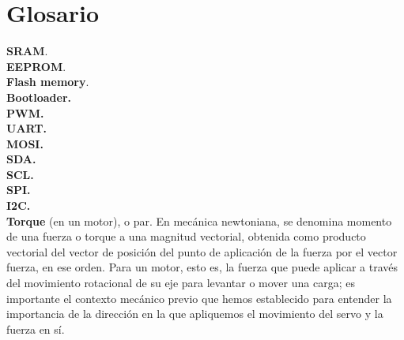 \documentclass[12pt]{article}
\begin{document}
	\section*{Glosario}
	
	\noindent \textbf{\large SRAM}. \\
	
	\noindent \textbf{\large EEPROM}. \\
	
	\noindent \textbf{\large Flash memory}. \\
	
	\noindent \textbf{\large Bootloader.} \\
	
	\noindent \textbf{\large PWM.} \\
	
	\noindent \textbf{\large UART.} \\
	
	\noindent \textbf{\large MOSI.} \\
	
	\noindent \textbf{\large SDA.} \\
	
	\noindent \textbf{\large SCL.} \\
	
	\noindent \textbf{\large SPI.} \\
	
	\noindent \textbf{\large I2C.} \\
	
	\noindent \textbf{\large Torque} (en un motor), o par. En mecánica newtoniana, se denomina momento de una fuerza o torque a una magnitud vectorial, obtenida como producto vectorial del vector de posición del punto de aplicación de la fuerza por el vector fuerza, en ese orden. Para un motor, esto es, la fuerza que puede aplicar a través del movimiento rotacional de su eje para levantar o mover una carga; es importante el contexto mecánico previo que hemos establecido para entender la importancia de la dirección en la que apliquemos el movimiento del servo y la fuerza en sí.\\
	
\end{document}
